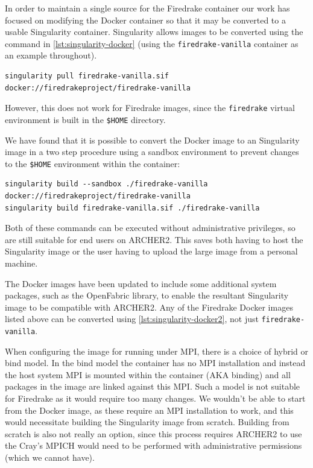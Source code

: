 \documentclass[a4paper,11pt]{article}
\begin{document}
In order to maintain a single source for the Firedrake container our work has focused on modifying the Docker container so that it may be converted to a usable Singularity container.
Singularity allows images to be converted using the command in \cref{lst:singularity-docker} (using the \verb`firedrake-vanilla` container as an example throughout).
\begin{lstlisting}[numbers=none,float,caption={One step (pull and) conversion from Docker image format to Singulrity image format},label={lst:singularity-docker}]
singularity pull firedrake-vanilla.sif docker://firedrakeproject/firedrake-vanilla
\end{lstlisting}
However, this does not work for Firedrake images, since the \verb`firedrake` virtual environment is built in the \verb`$HOME` directory.

We have found that it is possible to convert the Docker image to an Singularity image in a two step procedure using a sandbox environment to prevent changes to the \verb`$HOME` environment within the container:
\begin{lstlisting}[caption={Two step procedure 1. (pull and) build with sandbox from Dockerhub, 2. Build Singulrity image format},label={lst:singularity-docker2}]
singularity build --sandbox ./firedrake-vanilla docker://firedrakeproject/firedrake-vanilla
singularity build firedrake-vanilla.sif ./firedrake-vanilla
\end{lstlisting}
Both of these commands can be executed without administrative privileges, so are still suitable for end users on ARCHER2.
This saves both having to host the Singularity image or the user having to upload the large image from a personal machine.

The Docker images have been updated to include some additional system packages, such as the OpenFabric library, to enable the resultant Singularity image to be compatible with ARCHER2.
Any of the Firedrake Docker images listed above can be converted using \cref{lst:singularity-docker2}, not just \verb`firedrake-vanilla`.

When configuring the image for running under MPI, there is a choice of hybrid or bind model.
In the bind model the container has no MPI installation and instead the host system MPI is mounted within the container (AKA binding) and all packages in the image are linked against this MPI.
Such a model is not suitable for Firedrake as it would require too many changes.
We wouldn't be able to start from the Docker image, as these require an MPI installation to work, and this would necessitate building the Singularity image from scratch.
Building from scratch is also not really an option, since this process requires ARCHER2 to use the Cray's MPICH would need to be performed with administrative permissions (which we cannot have).
\end{document}
